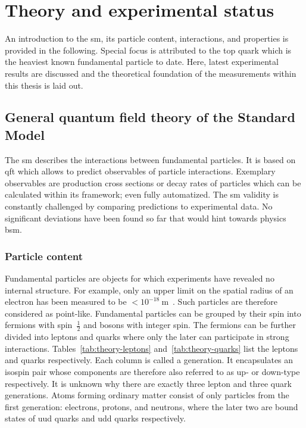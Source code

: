 \chapter{Theory and experimental status}

An introduction to the \gls{sm}, its particle content, interactions, and properties is provided in the following. Special focus is attributed to the top quark which is the heaviest known fundamental particle to date. Here, latest experimental results are discussed and the theoretical foundation of the measurements within this thesis is laid out.


\section{General quantum field theory of the Standard Model}

The \gls{sm} describes the interactions between fundamental particles. It is based on \gls{qft} which allows to predict observables of particle interactions. Exemplary observables are production cross sections or decay rates of particles which can be calculated within its framework; even fully automatized. The \gls{sm} validity is constantly challenged by comparing predictions to experimental data. No significant deviations have been found so far that would hint towards physics \gls{bsm}.


\subsection{Particle content}

Fundamental particles are objects for which experiments have revealed no internal structure. For example, only an upper limit on the spatial radius of an electron has been measured to be $<10^{-18}~\mathrm{m}$~\cite{PhysRevLett.97.030801}. Such particles are therefore considered as point-like. Fundamental particles can be grouped by their spin into fermions with spin~$\frac{1}{2}$ and bosons with integer spin. The fermions can be further divided into leptons and quarks where only the later can participate in strong interactions. Tables~\ref{tab:theory-leptons} and~\ref{tab:theory-quarks} list the leptons and quarks respectively. Each column is called a generation. It encapsulates an isospin pair whose components are therefore also referred to as up- or down-type respectively. It is unknown why there are exactly three lepton and three quark generations. Atoms forming ordinary matter consist of only particles from the first generation: electrons, protons, and neutrons, where the later two are bound states of uud quarks and udd quarks respectively.

